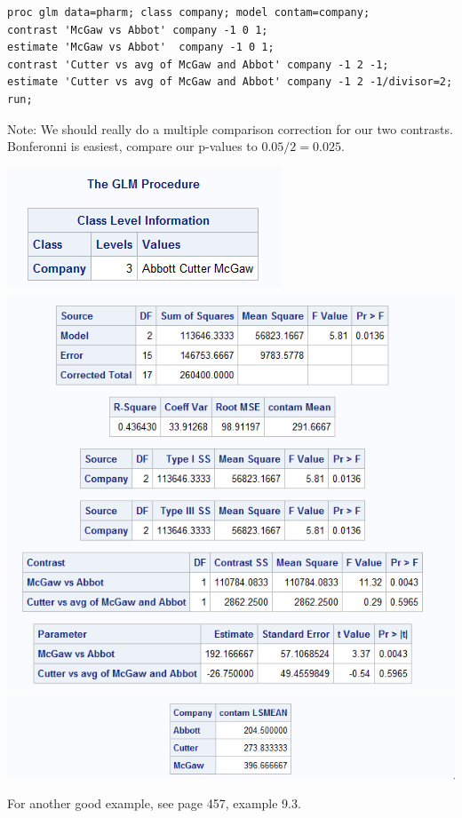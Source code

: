 \begin{small}
\begin{verbatim}
proc glm data=pharm; class company; model contam=company;
contrast 'McGaw vs Abbot' company -1 0 1;
estimate 'McGaw vs Abbot'  company -1 0 1;
contrast 'Cutter vs avg of McGaw and Abbot' company -1 2 -1;
estimate 'Cutter vs avg of McGaw and Abbot' company -1 2 -1/divisor=2; run;
\end{verbatim}
\end{small}
 Note: We should really do a multiple comparison correction for our two contrasts.  Bonferonni is easiest, compare our p-values to $0.05/2=0.025$.
\begin{flushleft}
\includegraphics[scale=0.7]{PharmGLM1}\\
\includegraphics[scale=0.7]{PharmGLM2}\\
\includegraphics[scale=0.7]{PharmGLM3}
\end{flushleft}

For another good example, see page 457, example 9.3.



